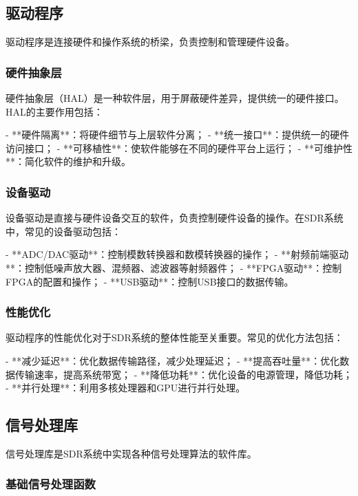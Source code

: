 ﻿\documentclass[UTF8]{ctexbook}
\begin{document}
\subsection{驱动程序}

驱动程序是连接硬件和操作系统的桥梁，负责控制和管理硬件设备。

\subsubsection{硬件抽象层}

硬件抽象层（HAL）是一种软件层，用于屏蔽硬件差异，提供统一的硬件接口。HAL的主要作用包括：

- **硬件隔离**：将硬件细节与上层软件分离；
- **统一接口**：提供统一的硬件访问接口；
- **可移植性**：使软件能够在不同的硬件平台上运行；
- **可维护性**：简化软件的维护和升级。

\subsubsection{设备驱动}

设备驱动是直接与硬件设备交互的软件，负责控制硬件设备的操作。在SDR系统中，常见的设备驱动包括：

- **ADC/DAC驱动**：控制模数转换器和数模转换器的操作；
- **射频前端驱动**：控制低噪声放大器、混频器、滤波器等射频器件；
- **FPGA驱动**：控制FPGA的配置和操作；
- **USB驱动**：控制USB接口的数据传输。

\subsubsection{性能优化}

驱动程序的性能优化对于SDR系统的整体性能至关重要。常见的优化方法包括：

- **减少延迟**：优化数据传输路径，减少处理延迟；
- **提高吞吐量**：优化数据传输速率，提高系统带宽；
- **降低功耗**：优化设备的电源管理，降低功耗；
- **并行处理**：利用多核处理器和GPU进行并行处理。

\subsection{信号处理库}

信号处理库是SDR系统中实现各种信号处理算法的软件库。

\subsubsection{基础信号处理函数}
\end{document}
